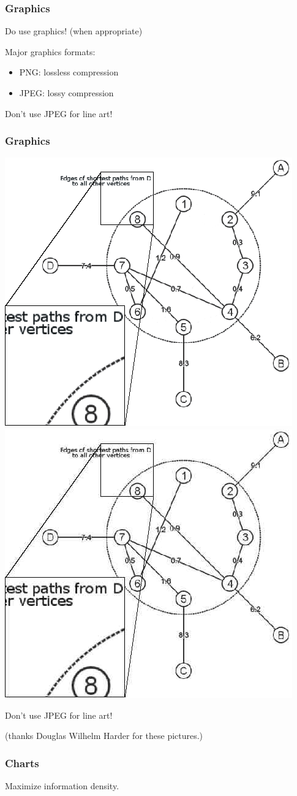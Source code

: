 \documentclass{beamer}
\begin{document}
\begin{frame}

\frametitle{Graphics}

\begin{center}
Do use graphics! (when appropriate)
\end{center}

Major graphics formats:

\begin{itemize}
\item PNG: lossless compression
\item JPEG: lossy compression
\end{itemize}

\alert{Don't use JPEG for line art!}

\end{frame}

\begin{frame}

\frametitle{Graphics}

\begin{center}
\includegraphics[width=.4\textwidth]{detail.png} \includegraphics[width=.4\textwidth]{detail.jpg}
\end{center}

\alert{Don't use JPEG for line art!}

(thanks Douglas Wilhelm Harder for these pictures.)
\end{frame}

\begin{frame}

\frametitle{Charts}

{ \Large
\begin{center}
Maximize information density.
\end{center}
}

\end{frame}
\end{document}
